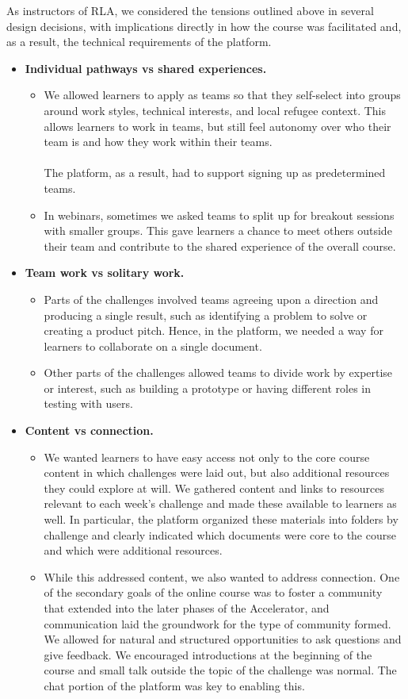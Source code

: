 \documentclass[12pt,twoside]{mitthesis}
\newcommand{\draft}[1]{{#1}}
\begin{document}
\draft{As instructors of RLA, we considered the tensions outlined above in several design decisions, with implications directly in how the course was facilitated and, as a result, the technical requirements of the platform.

\begin{itemize}
\item \textbf{Individual pathways vs shared experiences.}
\begin{itemize}
	\item We allowed learners to apply as teams so that they self-select into groups around work styles, technical interests, and local refugee context. This allows learners to work in teams, but still feel autonomy over who their team is and how they work within their teams.\\ \\The platform, as a result, had to support signing up as predetermined teams.
	\item In webinars, sometimes we asked teams to split up for breakout sessions with smaller groups. This gave learners a chance to meet others outside their team and contribute to the shared experience of the overall course.
\end{itemize}
\item \textbf{Team work vs solitary work.}
\begin{itemize}
	\item Parts of the challenges involved teams agreeing upon a direction and producing a single result, such as identifying a problem to solve or creating a product pitch. Hence, in the platform, we needed a way for learners to collaborate on a single document.
	\item Other parts of the challenges allowed teams to divide work by expertise or interest, such as building a prototype or having different roles in testing with users.
\end{itemize}
\item \textbf{Content vs connection.} 
\begin{itemize}
	\item We wanted learners to have easy access not only to the core course content in which challenges were laid out, but also additional resources they could explore at will. We gathered content and links to resources relevant to each week's challenge and made these available to learners as well. In particular, the platform organized these materials into folders by challenge and clearly indicated which documents were core to the course and which were additional resources.
	\item While this addressed content, we also wanted to address connection. One of the secondary goals of the online course was to foster a community that extended into the later phases of the Accelerator, and communication laid the groundwork for the type of community formed. We allowed for natural and structured opportunities to ask questions and give feedback. We encouraged introductions at the beginning of the course and small talk outside the topic of the challenge was normal. The chat portion of the platform was key to enabling this.
\end{itemize}
\end{itemize}

}
\end{document}
